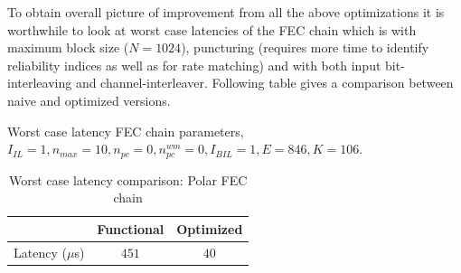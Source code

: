 To obtain overall picture of improvement from all the above optimizations it is worthwhile to look at worst case latencies of the FEC chain which is with maximum block size ($N = 1024$), puncturing (requires more time to identify reliability indices as well as for rate matching) and with both input bit-interleaving and channel-interleaver. Following table gives a comparison between naive and optimized versions.

Worst case latency FEC chain parameters, \newline
$I_{IL} = 1, n_{max} = 10, n_{pc} = 0 ,n_{pc}^{wm} = 0, I_{BIL} = 1, E = 846, K = 106$.
\begin{table}[!h]
	\begin{center}
		\caption{Worst case latency comparison: Polar FEC chain}
		\label{tab:worstFecChain}
		\begin{tabular}{c|c|c} %
			\textbf{ } & Functional & Optimized \\
			\hline
			Latency ($\mu$s) & $451$ & $40$\\
		\end{tabular}
	\end{center}
\end{table}
